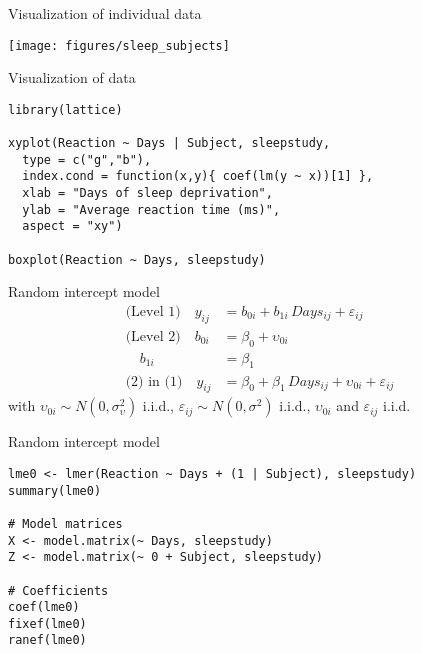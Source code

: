 \documentclass[aspectratio=169]{beamer}
\begin{document}
\begin{frame}{Visualization of individual data}
  \begin{center}
      \texttt{[image: figures/sleep\_subjects]}
  \end{center}
\end{frame}

{

\begin{frame}[fragile]{Visualization of data}
\begin{lstlisting}
library(lattice)

xyplot(Reaction ~ Days | Subject, sleepstudy,
  type = c("g","b"),
  index.cond = function(x,y){ coef(lm(y ~ x))[1] },
  xlab = "Days of sleep deprivation",
  ylab = "Average reaction time (ms)",
  aspect = "xy")

boxplot(Reaction ~ Days, sleepstudy)
\end{lstlisting}
\end{frame}

}

\begin{frame}{Random intercept model}
\begin{align*}
\text{(Level 1)}  \quad y_{ij} &= b_{0i} + b_{1i}\,Days_{ij} + \varepsilon_{ij}\\
\text{(Level 2)}  \quad b_{0i} &= \beta_0 + \upsilon_{0i}\\
                  \quad b_{1i} &= \beta_1\\
\text{(2) in (1)} \quad y_{ij} &= \beta_0 + \beta_1\,Days_{ij} +
                                  \upsilon_{0i} + \varepsilon_{ij}
\end{align*}
\vfill
with $\upsilon_{0i} \sim N(0, \sigma^2_{\upsilon})$ i.i.d.,
$\varepsilon_{ij} \sim N(0, \sigma^2)$ i.i.d., $\upsilon_{0i}$ and
$\varepsilon_{ij}$ i.i.d.\\[2ex]
\vfill
\end{frame}

{

\begin{frame}[fragile]{Random intercept model}
\begin{lstlisting}
lme0 <- lmer(Reaction ~ Days + (1 | Subject), sleepstudy)
summary(lme0)

# Model matrices
X <- model.matrix(~ Days, sleepstudy)
Z <- model.matrix(~ 0 + Subject, sleepstudy)

# Coefficients
coef(lme0)
fixef(lme0)
ranef(lme0)
\end{lstlisting}
\end{frame}

}
\end{document}
